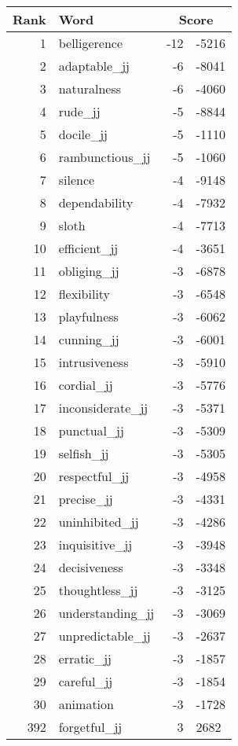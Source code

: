 \begin{longtable}[!htbp]{| rlr@{.}l |}
    \hline
    \textbf{Rank} & \textbf{Word} & \multicolumn{2}{c|}{\textbf{Score}} \\
    \hline
    \endhead
    1 & belligerence & -12 & -5216 \\
    2 & adaptable\_jj & -6 & -8041 \\
    3 & naturalness & -6 & -4060 \\
    4 & rude\_jj & -5 & -8844 \\
    5 & docile\_jj & -5 & -1110 \\
    6 & rambunctious\_jj & -5 & -1060 \\
    7 & silence & -4 & -9148 \\
    8 & dependability & -4 & -7932 \\
    9 & sloth & -4 & -7713 \\
    10 & efficient\_jj & -4 & -3651 \\
    11 & obliging\_jj & -3 & -6878 \\
    12 & flexibility & -3 & -6548 \\
    13 & playfulness & -3 & -6062 \\
    14 & cunning\_jj & -3 & -6001 \\
    15 & intrusiveness & -3 & -5910 \\
    16 & cordial\_jj & -3 & -5776 \\
    17 & inconsiderate\_jj & -3 & -5371 \\
    18 & punctual\_jj & -3 & -5309 \\
    19 & selfish\_jj & -3 & -5305 \\
    20 & respectful\_jj & -3 & -4958 \\
    21 & precise\_jj & -3 & -4331 \\
    22 & uninhibited\_jj & -3 & -4286 \\
    23 & inquisitive\_jj & -3 & -3948 \\
    24 & decisiveness & -3 & -3348 \\
    25 & thoughtless\_jj & -3 & -3125 \\
    26 & understanding\_jj & -3 & -3069 \\
    27 & unpredictable\_jj & -3 & -2637 \\
    28 & erratic\_jj & -3 & -1857 \\
    29 & careful\_jj & -3 & -1854 \\
    30 & animation & -3 & -1728 \\
    392 & forgetful\_jj & 3 & 2682 \\

\end{longtable}
